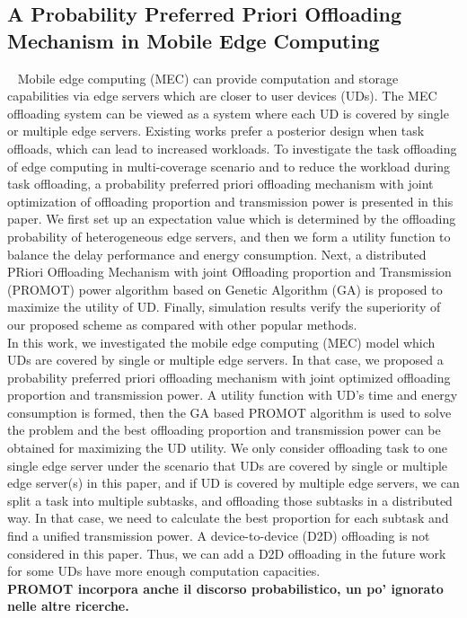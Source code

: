 \subsection{A Probability Preferred Priori Offloading Mechanism in Mobile Edge Computing}~\cite{wang2020probability}
Mobile edge computing (MEC) can provide computation and storage capabilities via edge
servers which are closer to user devices (UDs). The MEC offloading system can be viewed as a system
where each UD is covered by single or multiple edge servers. Existing works prefer a posterior design when
task offloads, which can lead to increased workloads. To investigate the task offloading of edge computing
in multi-coverage scenario and to reduce the workload during task offloading, a probability preferred priori
offloading mechanism with joint optimization of offloading proportion and transmission power is presented
in this paper. We first set up an expectation value which is determined by the offloading probability of
heterogeneous edge servers, and then we form a utility function to balance the delay performance and
energy consumption. Next, a distributed PRiori Offloading Mechanism with joint Offloading proportion
and Transmission (PROMOT) power algorithm based on Genetic Algorithm (GA) is proposed to maximize
the utility of UD. Finally, simulation results verify the superiority of our proposed scheme as compared
with other popular methods. \\
In this work, we investigated the mobile edge computing
(MEC) model which UDs are covered by single or multiple
edge servers. In that case, we proposed a probability
preferred priori offloading mechanism with joint optimized
offloading proportion and transmission power. A utility
function with UD’s time and energy consumption is formed,
then the GA based PROMOT algorithm is used to solve the
problem and the best offloading proportion and transmission
power can be obtained for maximizing the UD utility.
We only consider offloading task to one single edge server
under the scenario that UDs are covered by single or multiple
edge server(s) in this paper, and if UD is covered by multiple
edge servers, we can split a task into multiple subtasks, and
offloading those subtasks in a distributed way. In that case,
we need to calculate the best proportion for each subtask and
find a unified transmission power. A device-to-device (D2D)
offloading is not considered in this paper. Thus, we can add a
D2D offloading in the future work for some UDs have more
enough computation capacities. \\
\textbf{PROMOT incorpora anche il discorso probabilistico, un po' ignorato nelle altre ricerche.}


